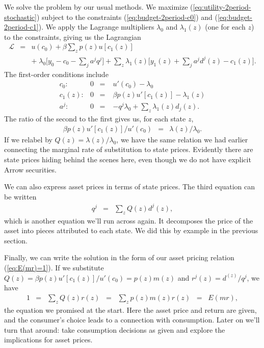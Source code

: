 We solve the problem by our usual methods.
We maximize (\ref{eq:utility-2period-stochastic})
subject to the constraints (\ref{eq:budget-2period-c0}) and (\ref{eq:budget-2period-c1}).
We apply the Lagrange multipliers $\lambda_0$ and $\lambda_1(z)$ (one for each $z$) to the constraints,
giving us the Lagrangian
\begin{eqnarray*}
    \mathcal{L} &=& u(c_0) + \beta \sum_z p(z) u[c_1(z)] \\
        &&   + \; \lambda_0 \Big[ y_0 - c_0 - \sum_j a^j q^j \Big]
        + \sum_z \lambda_1(z) \Big[ y_1(z) + \sum_j a^j d^j(z) - c_1(z) \Big] .
\end{eqnarray*}
The first-order conditions include
\begin{eqnarray*}
  c_0: &        0 \;\;=& u'(c_0) - \lambda_0 \\
  c_1(z): &     0 \;\;=& \beta p(z) u'[c_1(z)] - \lambda_1(z) \\
  a^j: &        0 \;\;=& - q^j \lambda_0 + \sum_z \lambda_1(z) d_j(z) .
\end{eqnarray*}
The ratio of the second to the first gives us, for each state $z$,
\begin{eqnarray*}
    \beta p(z) u'[c_1(z)] / u'(c_0) &=& \lambda(z)/\lambda_0 .
\end{eqnarray*}
If we relabel by $Q(z) = \lambda(z)/\lambda_0$, we have the same relation
we had earlier connecting  the marginal rate of substitution to state prices.
Evidently there are state prices hiding behind the scenes here,
even though we do not have explicit Arrow securities.

We can also express asset prices in terms of state prices.
The third equation can be written
\begin{eqnarray*}
    q^j &=& \sum_z Q(z) d^j(z) ,
\end{eqnarray*}
which is another equation we'll run across again.
It decomposes the price of the asset into pieces attributed to each state.
We did this by example in the previous section.

Finally, we can write the solution in the form of
our asset pricing relation (\ref{eq:E(mr)=1}).
If we substitute
$ Q(z) = \beta p(z) u'[c_1(z)] / u'(c_0) = p(z) m(z)$
and $r^j(z) = d^(z)/q^j $,
we have
\begin{eqnarray*}
    1 &=& \sum_z Q(z) r(z) \;\;=\;\; \sum_z p(z) m(z) r(z) \;\;=\;\; E (mr) ,
\end{eqnarray*}
the equation we promised at the start.
Here the asset price and return are given,
and the consumer's choice leads to a connection with consumption.
Later on we'll turn that around:
take consumption decisions as given and explore
the implications for asset prices.

